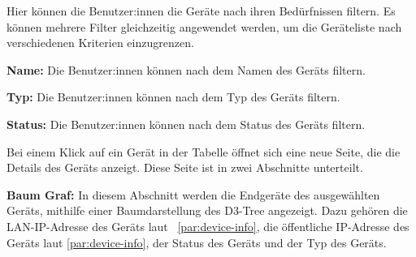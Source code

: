 \begin{compactitem}
\begin{compactitem}
\begin{compactitem}
\begin{compactitem}
                Hier können die Benutzer:innen die Geräte nach ihren Bedürfnissen filtern.
                Es können mehrere Filter gleichzeitig angewendet werden, um die Geräteliste nach verschiedenen Kriterien einzugrenzen.
                \begin{compactitem}
                    \item \textbf{Name:} Die Benutzer:innen können nach dem Namen des Geräts filtern.
                    \item \textbf{Typ:} Die Benutzer:innen können nach dem Typ des Geräts filtern.
                    \item \textbf{Status:} Die Benutzer:innen können nach dem Status des Geräts filtern.
                \end{compactitem}

                Bei einem Klick auf ein Gerät in der Tabelle öffnet sich eine neue Seite, die die Details des Geräts anzeigt.
                Diese Seite ist in zwei Abschnitte unterteilt.
                \begin{compactitem}
                    \item \textbf{Baum Graf:} In diesem Abschnitt werden die Endgeräte des ausgewählten Geräts,
                    mithilfe einer Baumdarstellung des D3-Tree angezeigt.
                    Dazu gehören die LAN-IP-Adresse des Geräts laut ~\ref{par:device-info}, die öffentliche IP-Adresse des Geräts laut \ref{par:device-info}, der Status des Geräts und der Typ des Geräts.


\end{compactitem}
\end{compactitem}
\end{compactitem}
\end{compactitem}
\end{compactitem}
